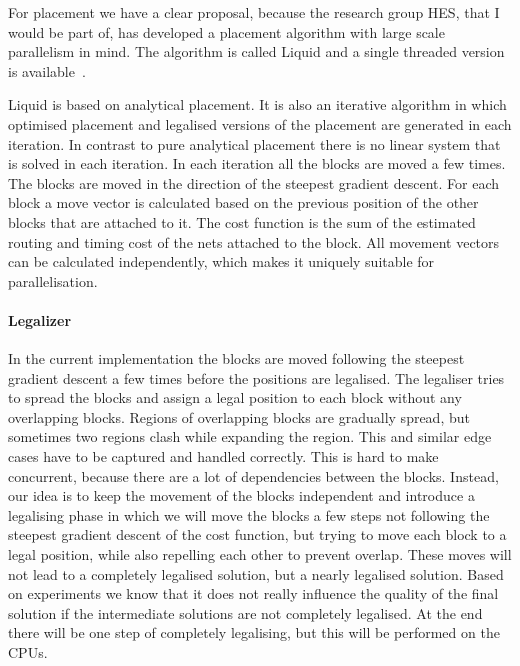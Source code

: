 \documentclass[a4paper,oneside,12pt]{article}
\begin{document}
For placement we have a clear proposal, because the research group HES, that I would be part of, has developed a placement algorithm with large scale parallelism in mind. The algorithm is called {\sc Liquid} and a single threaded version is available~\cite{liquid}.

{\sc Liquid} is based on analytical placement. It is also an iterative algorithm in which optimised placement and legalised versions of the placement are generated in each iteration. In contrast to pure analytical placement there is no linear system that is solved in each iteration. In each iteration all the blocks are moved a few times.  The blocks are moved in the direction of the steepest gradient descent. For each block a move vector is calculated based on the previous position of the other blocks that are attached to it. The cost function is the sum of the estimated routing and timing cost of the nets attached to the block. All movement vectors can be calculated independently, which makes it uniquely suitable for parallelisation.


\paragraph{Legalizer}
In the current implementation the blocks are moved following the steepest gradient descent a few times before the positions are legalised. The legaliser tries to spread the blocks and assign a legal position to each block without any overlapping blocks. Regions of overlapping blocks are gradually spread, but sometimes two regions clash while expanding the region. This and similar edge cases have to be captured and handled correctly. This is hard to make concurrent, because there are a lot of dependencies between the blocks.
Instead, our idea is to keep the movement of the blocks independent and introduce a legalising phase in which we will move the blocks a few steps not following the steepest gradient descent of the cost function, but trying to move each block to a legal position, while also repelling each other to prevent overlap. These moves will not lead to a completely legalised solution, but a nearly legalised solution. Based on experiments we know that it does not really influence the quality of the final solution if the intermediate solutions are not completely legalised.  At the end there will be one step of completely legalising, but this will be performed on the CPUs.
\end{document}
